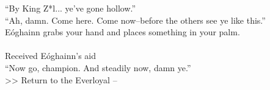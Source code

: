 “By King Z*l... ye’ve gone hollow.”\\

“Ah, damn. Come here. Come now--before the others see ye like this.”\\

Eóghainn grabs your hand and places something in your palm.\\
\\
 Received Eóghainn’s aid\\

“Now go, champion. And steadily now, damn ye.”\\

>>  Return to the Everloyal -- 